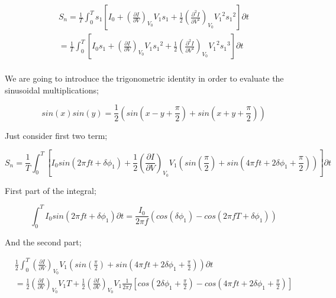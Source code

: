 \documentclass[10pt,a4paper,notitlepage]{article}
\begin{document}
\begin{equation}
  \begin{split}
  S_n=\frac{1}{T}\int_{0}^{T}s_1 \left[I_{0}+\left(\frac{\partial I}{\partial V}\right)_{V_0} V_1 s_1 +\frac{1}{2} \left(\frac{\partial^2 I}{\partial V^2}\right)_{V_0} {V_1}^2 {s_1}^2 \right]\partial t \\
  =\frac{1}{T}\int_{0}^{T} \left[I_{0}s_1+\left(\frac{\partial I}{\partial V}\right)_{V_0} V_1 {s_1}^2 +\frac{1}{2} \left(\frac{\partial^2 I}{\partial V^2}\right)_{V_0} {V_1}^2 {s_1}^3 \right]\partial t \\
\end{split}
\end{equation}

We are going to introduce the trigonometric identity in order to evaluate the
sinusoidal multiplications;

\begin{equation}
  sin(x)sin(y)=\frac{1}{2} \left(sin \left(x-y+\frac{\pi}{2}\right)+ sin \left(x+y+\frac{\pi}{2}\right) \right)
\end{equation}

Just consider first two term;

\begin{equation}
  S_n=\frac{1}{T} \int_{0}^{T} \left[I_0 sin\left(2 \pi f t + \delta \phi_1 \right) + \frac{1}{2} \left(\frac{\partial I}{\partial V} \right)_{V_0} V_1 \left(sin \left(\frac{\pi}{2}\right)+sin \left(4 \pi f t + 2 \delta \phi_1 + \frac{\pi}{2} \right) \right) \right] \partial t
\end{equation}

First part of the integral;

\begin{equation}
  \int_{0}^{T} I_0 sin(2 \pi f t + \delta \phi_1) \partial t = \frac{I_0}{2 \pi f} \left(cos(\delta \phi_1)-cos(2 \pi f T + \delta \phi_1) \right)
\end{equation}

And the second part;

\begin{equation}
  \begin{split}
  \frac{1}{2} \int_{0}^{T} \left(\frac{\partial I}{\partial V}\right)_{V_0} V_1 \left(sin\left(\frac{\pi}{2}\right)+sin \left(4 \pi f t +2 \delta \phi_1 +\frac{\pi}{2} \right)\right) \partial t \\
  =\frac{1}{2} \left(\frac{\partial I}{\partial V}\right)_{V_0} V_1 T + \frac{1}{2} \left(\frac{\partial I}{\partial V}\right)_{V_0} V_1 \frac{1}{2 \pi f}\left[cos \left(2 \delta \phi_1 + \frac{\pi}{2}\right)-cos \left(4 \pi f t +2 \delta \phi_1 +\frac{\pi}{2}  \right) \right]
\end{split}
\end{equation}
\end{document}
